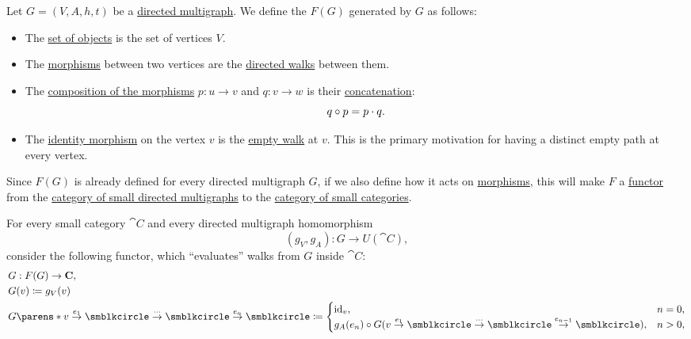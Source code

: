 \begin{definition}\label{def:directed_multigraph_free_category}
  Let \( G = (V, A, h, t) \) be a \hyperref[def:directed_multigraph]{directed multigraph}. We define the  \( F(G) \) generated by \( G \) as follows:
  \begin{itemize}
    \item The \hyperref[def:category/objects]{set of objects} is the set of vertices \( V \).

    \item The \hyperref[def:category/morphisms]{morphisms} between two vertices are the \hyperref[def:graph_walk/directed]{directed walks} between them.

    \item The \hyperref[def:category/composition]{composition of the morphisms} \( p: u \to v \) and \( q: v \to w \) is their \hyperref[def:graph_walk/concatenation]{concatenation}:
    \begin{equation*}
      q \bincirc p = p \cdot q.
    \end{equation*}

    \item The \hyperref[def:category/identity]{identity morphism} on the vertex \( v \) is the \hyperref[def:graph_walk/empty]{empty walk} at \( v \). This is the primary motivation for having a distinct empty path at every vertex.
  \end{itemize}

  Since \( F(G) \) is already defined for every directed multigraph \( G \), if we also define how it acts on \hyperref[def:directed_multigraph/homomorphism]{morphisms}, this will make \( F \) a \hyperref[def:functor]{functor} from the \hyperref[def:directed_multigraph/category]{category of small directed multigraphs} to the \hyperref[def:directed_multigraph/category]{category of small categories}.

  For every small category \( \cat{C} \) and every directed multigraph homomorphism
  \begin{equation*}
    (g_V, g_A): G \to U(\cat{C}),
  \end{equation*}
  consider the following functor, which \enquote{evaluates} walks from \( G \) inside \( \cat{C} \):
  \begin{equation}\label{eq:def:directed_multigraph_free_category/functor_from_homomorphism}
    \begin{aligned}
      &G: F(G) \to \cat{C}, \\
      &G(v) \coloneqq g_V(v) \\
      &G\parens*{ v \overset {e_1} \to \anon \overset \cdots \to \anon \overset {e_n} \to \anon } \coloneqq \begin{cases}
        \id_v,                                                                                                  &n = 0, \\
        g_A(e_n) \bincirc G(v \overset {e_1} \to \anon \overset \cdots \to \anon \overset {e_{n-1}} \to \anon), &n > 0,
      \end{cases}
    \end{aligned}
  \end{equation}


\end{definition}
